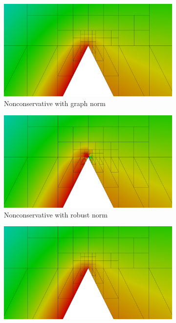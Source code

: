 \documentclass[letterpaper]{article}
\begin{document}
\begin{figure}
\centering
\begin{subfigure}[t]{0.45\textwidth}
\centering
\includegraphics[width=\textwidth]{figs/Wedge/graph16nc_zoom.png}
\caption{Nonconservative with graph norm}
\label{fig:wedgeGraph16nc_zoom}
\end{subfigure}
\begin{subfigure}[t]{0.45\textwidth}
\centering
\includegraphics[width=\textwidth]{figs/Wedge/robust16nc_zoom.png}
\caption{Nonconservative with robust norm}
\label{fig:wedgeRobust16nc_zoom}
\end{subfigure}
\begin{subfigure}[t]{0.45\textwidth}
\centering
\includegraphics[width=\textwidth]{figs/Wedge/graph16c_zoom.png}

\end{subfigure}
\end{figure}
\end{document}
